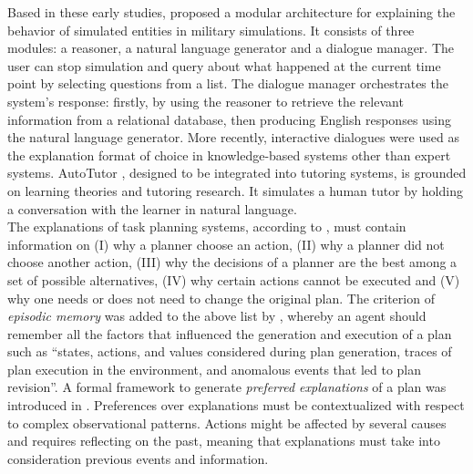 \documentclass[final,1p,times]{elsarticle}
\begin{document}
Based in these early studies, \cite{core2006building,gomboc2005design,lane2005explainable,van2004explainable} proposed a modular architecture for explaining the behavior of simulated entities in military simulations. It consists of three modules: a reasoner, a natural language generator and a dialogue manager. The user can stop simulation and query about what happened at the current time point by selecting questions from a list. The dialogue manager orchestrates the system’s response: firstly, by using the reasoner to retrieve the relevant information from a relational database, then producing English responses using the natural language generator. 
More recently, interactive dialogues were used as the explanation format of choice in knowledge-based systems other than expert systems. AutoTutor \cite{graesser2005autotutor}, designed to be integrated into tutoring systems, is grounded on learning theories and tutoring research. It simulates a human tutor by holding a conversation with the learner in natural language.\\ 

The explanations of task planning systems, according to \cite{fox2017explainable,langley2017explainable}, must contain information on (I) why a planner choose an action, (II) why a planner did not choose another action, (III) why the decisions of a planner are the best among a set of possible alternatives, (IV) why certain actions cannot be executed and (V) why one needs or does not need to change the original plan.
The criterion of \textit{episodic memory} was added to the above list by \cite{langley2017explainable}, whereby an agent should remember all the factors that influenced the generation and execution of a plan such as ``states, actions, and values considered during plan generation, traces of plan execution in the environment, and anomalous events that led to plan revision''. 
A formal framework to generate \textit{preferred explanations} of a plan was introduced in \cite{sohrabi2011preferred}. Preferences over explanations must be contextualized with respect to complex observational patterns. Actions might be affected by several causes and requires reflecting on the past, meaning that explanations must take into consideration previous events and information. 
\end{document}
